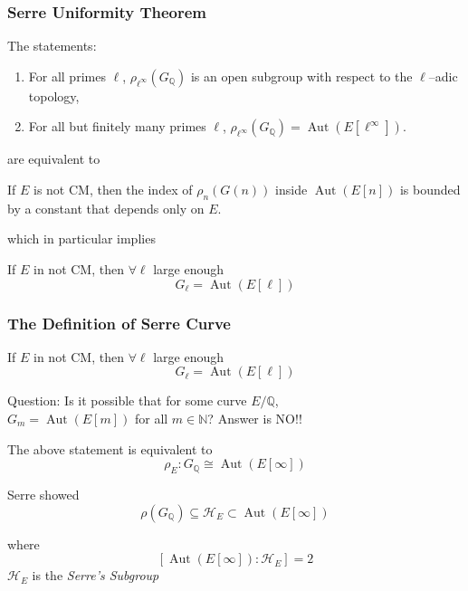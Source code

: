 \documentclass[10pt,final]{beamer} %
\newcommand{\Q}{\mathbb Q}
\newcommand{\N}{\mathbb N}
\theoremstyle{definition}
\begin{document}
\begin{frame}
\frametitle{Serre Uniformity Theorem} 

The statements:

\begin{enumerate}
\item For all primes $\ell$, $\rho_{\ell^\infty}(G_\Q)$ is an open subgroup with respect to the $\ell$--adic topology,
 \item For all but finitely many primes $\ell$, $\rho_{\ell^\infty}(G_\Q)=\operatorname{Aut}(E[\ell^\infty])$.
 \end{enumerate}

 are equivalent to \pause

\begin{theorem} If $E$ is not CM, 
then the index of $\rho_n(G(n))$ inside $\operatorname{Aut}(E[n])$ is bounded by a constant that depends
only on $E$. 
\end{theorem}\pause

which in particular implies

\begin{corollary} If $E$ in not CM, then   $\forall\ell$ large enough 
$$G_\ell= \operatorname{Aut}(E[\ell])$$
\end{corollary}\pause
\end{frame}

\begin{frame}
\frametitle{The Definition of Serre Curve} 

\begin{corollary} If $E$ in not CM, then   $\forall\ell$ large enough 
$$G_\ell= \operatorname{Aut}(E[\ell])$$
\end{corollary}\pause

\begin{block}{Question:}
Is it possible that for some curve $E/\Q$,\\ 
$G_m= \operatorname{Aut}(E[m])$
for all $m\in\N$? \pause \alert{Answer is NO!!}
\end{block}\pause

The above statement is equivalent to 
$$\rho_E: G_\Q\cong \operatorname{Aut}(E[\infty])$$\pause

Serre showed
$$\rho(G_\Q)\subseteq \mathcal H_E\subset \operatorname{Aut}(E[\infty])$$ \pause

where 
$$[\operatorname{Aut}(E[\infty]):\mathcal H_E]=2$$
\alert{$\mathcal H_E$ is the \emph{Serre's Subgroup}} 
\end{frame}
\end{document}
